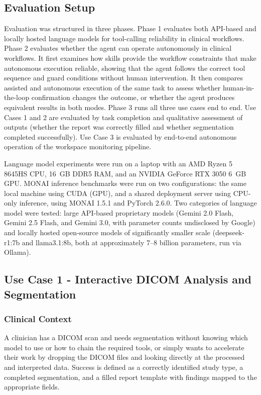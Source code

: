 \documentclass[conference]{IEEEtran}
\begin{document}
\subsection{Evaluation Setup}

Evaluation was structured in three phases. Phase 1 evaluates both API-based and locally hosted language models for tool-calling reliability in clinical workflows. Phase 2 evaluates whether the agent can operate autonomously in clinical workflows. It first examines how skills provide the workflow constraints that make autonomous execution reliable, showing that the agent follows the correct tool sequence and guard conditions without human intervention. It then compares assisted and autonomous execution of the same task to assess whether human-in-the-loop confirmation changes the outcome, or whether the agent produces equivalent results in both modes. Phase 3 runs all three use cases end to end. Use Cases 1 and 2 are evaluated by task completion and qualitative assessment of outputs (whether the report was correctly filled and whether segmentation completed successfully). Use Case 3 is evaluated by end-to-end autonomous operation of the workspace monitoring pipeline.

Language model experiments were run on a laptop with an AMD Ryzen 5 8645HS CPU, 16~GB DDR5 RAM, and an NVIDIA GeForce RTX 3050 6~GB GPU. MONAI inference benchmarks were run on two configurations: the same local machine using CUDA (GPU), and a shared deployment server using CPU-only inference, using MONAI 1.5.1 and PyTorch 2.6.0.
Two categories of language model were tested: large API-based proprietary models (Gemini 2.0 Flash, Gemini 2.5 Flash, and Gemini 3.0, with parameter counts undisclosed by Google) and locally hosted open-source models of significantly smaller scale (deepseek-r1:7b and llama3.1:8b, both at approximately 7--8 billion parameters, run via Ollama).

\subsection{Use Case 1 - Interactive DICOM Analysis and Segmentation}

\subsubsection{Clinical Context}
A clinician has a DICOM scan and needs segmentation without knowing which model to use or how to chain the required tools, or simply wants to accelerate their work by dropping the DICOM files and looking directly at the processed and interpreted data. Success is defined as a correctly identified study type, a completed segmentation, and a filled report template with findings mapped to the appropriate fields.
\end{document}
